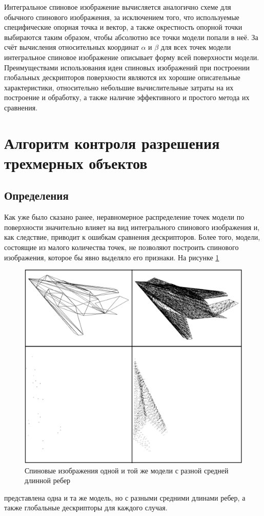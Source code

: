 \documentclass[14pt]{article}
\numberwithin{figure}{section}
\numberwithin{equation}{section}
\begin{document}
Интегральное спиновое изображение вычисляется аналогично схеме для обычного спинового изображения, за исключением того, что используемые специфические опорная точка и вектор, а также окрестность опорной точки выбираются таким образом, чтобы абсолютно все точки модели попали в неё. За счёт вычисления относительных координат $\alpha$ и $\beta$ для всех точек модели интегральное спиновое изображение описывает форму всей поверхности модели. Преимуществами использования идеи спиновых изображений при построении глобальных дескрипторов поверхности являются их хорошие описательные характеристики, относительно небольшие вычислительные затраты на их построение и обработку, а также наличие эффективного и простого метода их сравнения.
\newpage

\section{Алгоритм контроля разрешения трехмерных объектов}\label{sect2}

\subsection{Определения}

Как уже было сказано ранее, неравномерное распределение точек модели по поверхности значительно влияет на вид интегрального спинового изображения и, как следствие, приводит к ошибкам сравнения дескрипторов. Более того, модели, состоящие из малого количества точек, не позволяют построить спинового изображения, которое бы явно выделяло его признаки. На рисунке \ref{ris:5}
\begin{figure}[h]
	\begin{center}
		\includegraphics[scale=0.27]{5.JPG}
		\caption{Спиновые изображения одной и той же модели с разной средней длинной ребер}
		\label{ris:5}
	\end{center}
\end{figure}
 представлена одна и та же модель, но с разными средними длинами ребер, а также глобальные дескрипторы для каждого случая.
\end{document}
